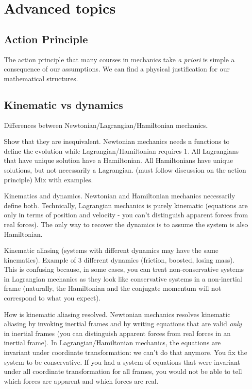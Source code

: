 \documentclass{article}
\begin{document}
\section{Advanced topics}

\subsection{Action Principle}

The action principle that many courses in mechanics take \emph{a priori} is simple a consequence of our assumptions. We can find a physical justification for our mathematical structures.

\subsection{Kinematic vs dynamics}

Differences between Newtonian/Lagrangian/Hamiltonian mechanics.

Show that they are inequivalent. Newtonian mechanics needs n functions to define the evolution while Lagrangian/Hamiltonian requires 1. All Lagrangians that have unique solution have a Hamiltonian. All Hamiltonians have unique solutions, but not necessarily a Lagrangian. (must follow discussion on the action principle) Mix with examples.

Kinematics and dynamics. Newtonian and Hamiltonian mechanics necessarily define both. Technically, Lagrangian mechanics is purely kinematic (equations are only in terms of position and velocity - you can't distinguish apparent forces from real forces). The only way to recover the dynamics is to assume the system is also Hamiltonian.

Kinematic aliasing (systems with different dynamics may have the same kinematics). Example of 3 different dynamics (friction, boosted, losing mass). This is confusing because, in some cases, you can treat non-conservative systems in Lagrangian mechanics as they look like conservative systems in a non-inertial frame (naturally, the Hamiltonian and the conjugate momentum will not correspond to what you expect).

How is kinematic aliasing resolved. Newtonian mechanics resolves kinematic aliasing by invoking inertial frames and by writing equations that are valid \emph{only} in inertial frames (you can distinguish apparent forces from real forces in an inertial frame).  In Lagrangian/Hamiltonian mechanics, the equations are invariant under coordinate transformation: we can't do that anymore. You fix the system to be conservative. If you had a system of equations that were invariant under all coordinate transformation for all frames, you would not be able to tell which forces are apparent and which forces are real.
\end{document}
